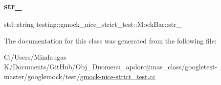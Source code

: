 \subsubsection{\texorpdfstring{str\_}{str\_}}
{\footnotesize\ttfamily std\+::string testing\+::gmock\+\_\+nice\+\_\+strict\+\_\+test\+::\+Mock\+Bar\+::str\+\_\+\hspace{0.3cm}{\ttfamily [private]}}



The documentation for this class was generated from the following file\+:\begin{DoxyCompactItemize}
\item 
C\+:/\+Users/\+Mindaugas K/\+Documents/\+Git\+Hub/\+Obj\+\_\+\+Duomenu\+\_\+apdorojimas\+\_\+class/googletest-\/master/googlemock/test/\mbox{\hyperlink{googletest-master_2googlemock_2test_2gmock-nice-strict__test_8cc}{gmock-\/nice-\/strict\+\_\+test.\+cc}}\end{DoxyCompactItemize}
